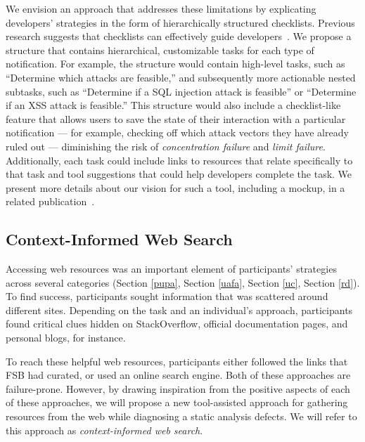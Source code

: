 \documentclass[10pt,journal,compsoc]{IEEEtran}
\begin{document}
We envision an approach that addresses these limitations by explicating developers' strategies in the form of hierarchically structured checklists.
Previous research suggests that checklists can effectively guide developers~\cite{phang2009triaging}.
We propose a structure that contains hierarchical, customizable tasks for each type of notification.
For example, the structure would contain high-level tasks, such as ``Determine which attacks are feasible,'' and subsequently more actionable nested subtasks, such as ``Determine if a SQL injection attack is feasible'' or ``Determine if an XSS attack is feasible.''
This structure would also include a checklist-like feature that allows users to save the state of their interaction with a particular notification --- for example, checking off which attack vectors they have already ruled out --- diminishing the risk of \emph{concentration failure} and \emph{limit failure}.
Additionally, each task could include links to resources that relate specifically to that task and tool suggestions that could help developers complete the task.
We present more details about our vision for such a tool, including a mockup, in a related publication~\cite{smith2016identifying}.

\subsection{Context-Informed Web Search}
Accessing web resources was an important element of participants' strategies across several categories (Section \ref{pupa}, Section \ref{uafa}, Section \ref{uc}, Section \ref{rd}).
To find success, participants sought information that was scattered around different sites.
Depending on the task and an individual's approach, participants found critical clues hidden on StackOverflow, official documentation pages, and personal blogs, for instance. 

To reach these helpful web resources, participants either followed the links that FSB had curated, or used an online search engine. 
Both of these approaches are failure-prone.
However, by drawing inspiration from the positive aspects of each of these approaches, we will propose a new tool-assisted approach for gathering resources from the web while diagnosing a static analysis defects. 
We will refer to this approach as \textit{context-informed web search}.
\end{document}
